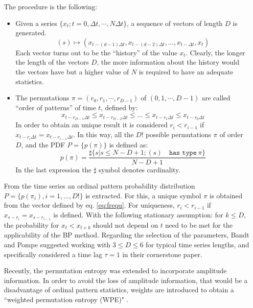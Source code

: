 The procedure is the following:
\begin{itemize}
	\item Given a series $\{x_t; t=0, \Delta t, \cdots,N\Delta t \}$, a sequence of vectors of length $D$ is generated.
		\begin{equation}
		(s)\longmapsto\left(x_{t-(d-1)\Delta t},x_{t-(d-2)\Delta t},\dots,x_{t-\Delta t},x_{t}\right) 
		\label{eq:vectores}
		\end{equation}
		Each vector turns out to be the ``history'' of the value $x_t$. Clearly, the longer the length of the vectors $D$, the more information about the history would the vectors have but a higher value of $N$ is required to have an adequate statistics. 
	\item The permutations $\pi=(r_0, r_1, \cdots, r_{D-1})$ of $(0, 1, \cdots, D-1)$ are called ``order of patterns'' of time $t$, defined by:
		\begin{equation}
		\label{eq:permuta}
		x_{t-r_{D-1}\Delta t}\le x_{t-r_{D-2}\Delta t}\le\dots\le x_{t-r_{1}\Delta t}\le x_{t-r_0\Delta t}
		\end{equation}
		In order to obtain an unique result it is considered $r_i<r_{i-1}$ if $x_{t-r_{i}\Delta t}=x_{t-r_{i-1}\Delta t}$.
		In this way, all the $D!$ possible permutations $\pi$ of order $D$, and the PDF $P=\{p(\pi)\}$ is defined as:
		\begin{equation}
		\label{eq:frequ}
		p(\pi)=\frac{\sharp \{s|s\leq N-D+1; (s) \quad \texttt{has type}~\pi\}}{N-D+1}
		\end{equation}
		In the last expression the $\sharp$ symbol denotes cardinality.
\end{itemize}

From the time series an ordinal pattern probability distribution $P = \{ p(\pi_i), i = 1, \dots, D! \}$ is extracted.
For this, a unique symbol $\pi$ is obtained from the vector defined by eq. \ref{eq:frequ}.
For uniqueness, $r_i < r_{i-1}$ if $x_{s-r_{i}} = x_{s-r_{i-1}}$ is defined.
With the following stationary assumption: for $k \leq D$, the probability for $x_t < x_{t+k}$ should not depend on $t$ need to be met for the applicability of the BP method.
Regarding the selection of the parameters, Bandt and Pompe suggested working with $3 \leq D \leq 6$ for typical time series lengths, and specifically considered a time lag $\tau = 1$ in their cornerstone paper.

Recently, the permutation entropy was extended to incorporate amplitude information.
In order to avoid the loss of amplitude information, that would be a disadvantage of ordinal pattern statistics, weights are introduced to obtain a ``weighted permutation entropy (WPE)" \cite{Fadlallah2013}.

